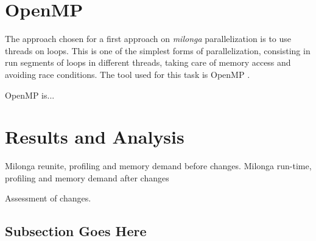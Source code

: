 \documentclass{anstrans}
\begin{document}
\section{OpenMP}

The approach chosen for a first approach on \textit{milonga} parallelization
is to use threads on loops. This is one of the simplest forms of parallelization,
consisting in run segments of loops in different threads, taking care of memory
access and avoiding race conditions. The tool used for this task is OpenMP
\cite{Dagum1998}.

OpenMP is...



\section{Results and Analysis}

Milonga reunite, profiling and memory demand before changes.
Milonga run-time, profiling and memory demand after changes

Assessment of changes.

\subsection{Subsection Goes Here}

\end{document}
